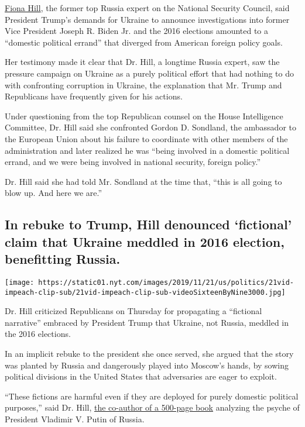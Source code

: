 \href{https://www.nytimes.com/2019/11/21/us/politics/fiona-hill-trump-impeachment.html}{Fiona
Hill}, the former top Russia expert on the National Security Council,
said President Trump's demands for Ukraine to announce investigations
into former Vice President Joseph R. Biden Jr. and the 2016 elections
amounted to a ``domestic political errand'' that diverged from American
foreign policy goals.

Her testimony made it clear that Dr. Hill, a longtime Russia expert, saw
the pressure campaign on Ukraine as a purely political effort that had
nothing to do with confronting corruption in Ukraine, the explanation
that Mr. Trump and Republicans have frequently given for his actions.

Under questioning from the top Republican counsel on the House
Intelligence Committee, Dr. Hill said she confronted Gordon D. Sondland,
the ambassador to the European Union about his failure to coordinate
with other members of the administration and later realized he was
``being involved in a domestic political errand, and we were being
involved in national security, foreign policy.''

Dr. Hill said she had told Mr. Sondland at the time that, ``this is all
going to blow up. And here we are.''

\hypertarget{in-rebuke-to-trump-hill-denounced-fictional-claim-that-ukraine-meddled-in-2016-election-benefitting-russia}{%
\subsection{In rebuke to Trump, Hill denounced `fictional' claim that
Ukraine meddled in 2016 election, benefitting
Russia.}\label{in-rebuke-to-trump-hill-denounced-fictional-claim-that-ukraine-meddled-in-2016-election-benefitting-russia}}

\texttt{[image: https://static01.nyt.com/images/2019/11/21/us/politics/21vid-impeach-clip-sub/21vid-impeach-clip-sub-videoSixteenByNine3000.jpg]}

Dr. Hill criticized Republicans on Thursday for propagating a
``fictional narrative'' embraced by President Trump that Ukraine, not
Russia, meddled in the 2016 elections.

In an implicit rebuke to the president she once served, she argued that
the story was planted by Russia and dangerously played into Moscow's
hands, by sowing political divisions in the United States that
adversaries are eager to exploit.

``These fictions are harmful even if they are deployed for purely
domestic political purposes,'' said Dr. Hill,
\href{https://www.nytimes.com/2019/11/21/us/politics/who-is-fiona-hill.html}{the
co-author of a 500-page book} analyzing the psyche of President Vladimir
V. Putin of Russia.

